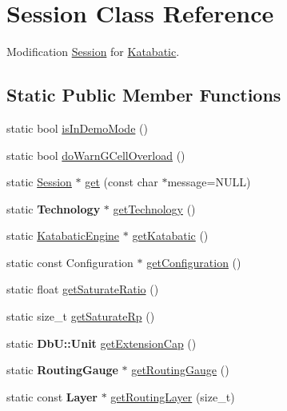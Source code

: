 \hypertarget{classKatabatic_1_1Session}{}\section{Session Class Reference}
\label{classKatabatic_1_1Session}


Modification \hyperlink{classKatabatic_1_1Session}{Session} for \hyperlink{namespaceKatabatic}{Katabatic}.  


\subsection*{Static Public Member Functions}
\begin{DoxyCompactItemize}
\item 
static bool \hyperlink{classKatabatic_1_1Session_a037c7ec3b18ec43973f2e6fe3a172000}{is\+In\+Demo\+Mode} ()
\item 
static bool \hyperlink{classKatabatic_1_1Session_ad41e6fb02bd7bb01c27fb6aae36f0ddc}{do\+Warn\+G\+Cell\+Overload} ()
\item 
static \hyperlink{classKatabatic_1_1Session}{Session} $\ast$ \hyperlink{classKatabatic_1_1Session_a76f17c3642eaeba85fa0af5ae9d208b4}{get} (const char $\ast$message=N\+U\+LL)
\item 
static \textbf{ Technology} $\ast$ \hyperlink{classKatabatic_1_1Session_a109acfd064f3c1854abb8bb2c9b4ad30}{get\+Technology} ()
\item 
static \hyperlink{classKatabatic_1_1KatabaticEngine}{Katabatic\+Engine} $\ast$ \hyperlink{classKatabatic_1_1Session_a1ec4ff2ad2a5b964c0ff98170a366197}{get\+Katabatic} ()
\item 
static const Configuration $\ast$ \hyperlink{classKatabatic_1_1Session_a4d9fd503149d2fff66eb8ba3955b7a13}{get\+Configuration} ()
\item 
static float \hyperlink{classKatabatic_1_1Session_a266a4079ca235e8fdb622ef4996d324d}{get\+Saturate\+Ratio} ()
\item 
static size\+\_\+t \hyperlink{classKatabatic_1_1Session_adfdaa8b3e81de14fce1f99444b35fcda}{get\+Saturate\+Rp} ()
\item 
static \textbf{ Db\+U\+::\+Unit} \hyperlink{classKatabatic_1_1Session_a909ce95ac840ee708f9a49366f0c2690}{get\+Extension\+Cap} ()
\item 
static \textbf{ Routing\+Gauge} $\ast$ \hyperlink{classKatabatic_1_1Session_a9a05289b33122f312aa2c88c4b023292}{get\+Routing\+Gauge} ()
\item 
static const \textbf{ Layer} $\ast$ \hyperlink{classKatabatic_1_1Session_a3efd0f0d87be640dc566c1afd821e5e6}{get\+Routing\+Layer} (size\+\_\+t)

\end{DoxyCompactItemize}
